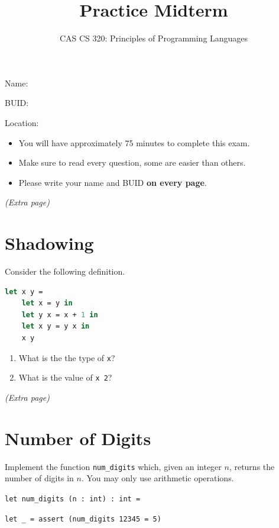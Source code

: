 \documentclass{article}
\title{Practice Midterm}
\author{CAS CS 320: Principles of Programming Languages}
\theoremstyle{remark} \newtheorem*{solution}{Solution}
\begin{document}
\maketitle

\noindent Name:

\bigskip

\noindent BUID:

\bigskip

\noindent Location:

\bigskip

\begin{itemize}
\item You will have approximately 75 minutes to complete this exam.
\item Make sure to read every question, some are easier than others.
\item Please write your name and BUID \textbf{on every page}.
\end{itemize}

\pagebreak
\textit{(Extra page)}

\pagebreak
\section{Shadowing}

Consider the following definition.
\begin{lstlisting}[language=ocaml]
  let x y =
    let x = y in
    let y x = x + 1 in
    let x y = y x in
    x y
\end{lstlisting}
\begin{enumerate}
\item
  What is the the type of \texttt{x}?
  \vspace{1in}
\item
  What is the value of \texttt{x 2}?
\end{enumerate}

\pagebreak
\textit{(Extra page)}

\pagebreak
\section{Number of Digits}

Implement the function \texttt{num\_digits} which, given an integer $n$, returns the number of digits in $n$.
You may only use arithmetic operations.
\bigskip

\noindent
\texttt{let num\_digits (n : int) : int =}
\vfill

\noindent
\texttt{let \_ = assert (num\_digits 12345 = 5)}
\end{document}
